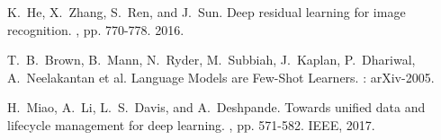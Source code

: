 \documentclass[11pt]{article}
\begin{document}
\begin{thebibliography}{10}
\begin{small}
 K.~He, X.~Zhang, S.~Ren, and J.~Sun. \newblock Deep residual learning for image recognition. , pp. 770-778. 2016.

 T.~B.~Brown, B.~Mann, N.~Ryder, M.~Subbiah, J.~Kaplan, P.~Dhariwal, A.~Neelakantan et al. \newblock Language Models are Few-Shot Learners. : arXiv-2005.

 H.~Miao, A.~Li, L.~S.~Davis, and A.~Deshpande. \newblock Towards unified data and lifecycle management for deep learning. , pp. 571-582. IEEE, 2017.

\end{small}
\end{thebibliography}
\end{document}
